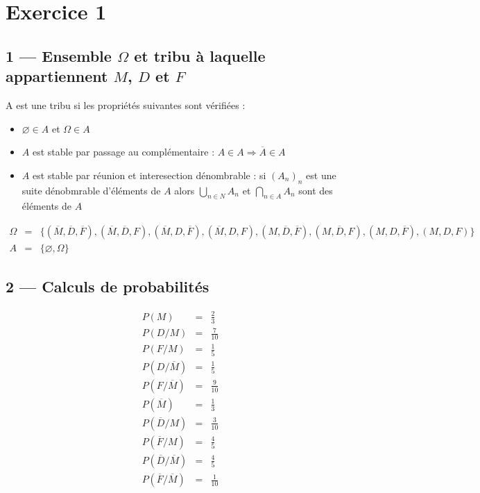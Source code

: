 \documentclass[a4paper, 11pt]{book}
\begin{document}
	\maketitle
	\section*{Exercice 1}
	\subsection*{1 --- Ensemble $\Omega$ et tribu à laquelle appartiennent $M$, $D$ et $F$}
		A est une tribu si les propriétés suivantes sont vérifiées : 
\begin{itemize}
	\item $\varnothing \in A$ et $\Omega \in A$
	\item $A$ est stable par passage au complémentaire : $A \in A \Rightarrow \overline A \in A$
	\item $A$ est stable par réunion et interesection dénombrable : si $(A_n)_n$ est une suite dénobmrable d'éléments de $A$ alors $\bigcup_{n\in N} A_n$ et $\bigcap_{n\in A}A_n$ sont des éléments de $A$
\end{itemize}
	\begin{eqnarray*}
		\Omega&=&\{(\overline M, \overline D, \overline F), (\overline M, \overline D, F), (\overline M, D, \overline F), (\overline M, D, F), (M, \overline D, \overline F), (M, \overline D, F), (M, D, \overline F), (M, D, F)\}\\
	A &=& \{\varnothing, \Omega\}
	\end{eqnarray*}
	\subsection*{2 --- Calculs de probabilités}
	\begin{multicols}{4}
	\begin{eqnarray*}
		P(M) &=& \frac{2}{3}\\
		P(D/M) &=&  \frac{7}{10}\\
		P(F/M) &=&  \frac{1}{5}\\
		P(D/\overline M) &=&  \frac{1}{5}\\
		P(F/\overline M) &=&  \frac{9}{10}\\
		P(\overline M) &=&  \frac{1}{3}\\
		P(\overline D/M) &=&  \frac{3}{10}\\
		P(\overline F / M) &=&  \frac{4}{5}\\
		P(\overline D / \overline M) &=&  \frac{4}{5}\\
		P(\overline F / \overline M) &=&  \frac{1}{10}
	\end{eqnarray*}
\end{multicols}
\end{document}
